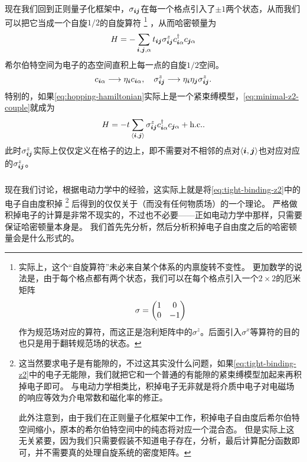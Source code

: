 现在我们回到正则量子化框架中，$\sigma_{\vb*{i} \vb*{j}}$在每一个格点引入了$\pm 1$两个状态，从而我们可以把它当成一个自旋$1/2$的自旋算符%
\footnote{实际上，这个“自旋算符”未必来自某个体系的内禀旋转不变性。
更加数学的说法是，由于每个格点都有两个状态，我们可以在每个格点引入一个$2\times 2$的厄米矩阵
\[
    {\sigma} = \pmqty{1 & 0 \\ 0 & -1}
\]
作为规范场对应的算符，而这正是泡利矩阵中的${\sigma}^z$。后面引入${\sigma}^x$等算符的目的也只是用于翻转规范场的状态。
}%
，从而哈密顿量为
\begin{equation}
    {H} = - \sum_{\vb*{i}, \vb*{j}, \alpha} t_{\vb*{i} \vb*{j}} {\sigma}^z_{\vb*{i} \vb*{j}} {c}_{\vb*{i} \alpha}^\dagger {c}_{\vb*{j} \alpha}
    \label{eq:minimal-z2-couple}
\end{equation}
希尔伯特空间为电子的态空间直积上每一点的自旋$1/2$空间。
\begin{equation}
    {c}_{\vb*{i} \alpha} \longrightarrow \eta_{\vb*{i}} {c}_{\vb*{i} \alpha}, \quad {\sigma}_{\vb*{i} \vb*{j}}^z \longrightarrow \eta_{\vb*{i}} \eta_{\vb*{j}} {\sigma}_{\vb*{i} \vb*{j}}^z.
\end{equation}
特别的，如果\eqref{eq:hopping-hamiltonian}实际上是一个紧束缚模型，\eqref{eq:minimal-z2-couple}就成为
\begin{equation}
    {H} = - t \sum_{\langle \vb*{i}, \vb*{j} \rangle} {\sigma}^z_{\vb*{i} \vb*{j}} {c}_{\vb*{i} \alpha}^\dagger {c}_{\vb*{j} \alpha} + \text{h.c.}.
    \label{eq:tight-binding-z2}
\end{equation}
此时$\sigma_{\vb*{i} \vb*{j}}^z$实际上仅仅定义在格子的边上，即不需要对不相邻的点对$\langle \vb*{i}, \vb*{j} \rangle$也对应对应的$\sigma_{\vb*{i} \vb*{j}}^z$。

\subsubsection{}

现在我们讨论，根据电动力学中的经验，这实际上就是将\eqref{eq:tight-binding-z2}中的电子自由度积掉%
\footnote{
    这当然要求电子是有能隙的，不过这其实没什么问题，如果\eqref{eq:tight-binding-z2}中的电子无能隙，我们就把它和一个普通的有能隙的紧束缚模型加起来再积掉电子即可。
    与电动力学相类比，积掉电子无非就是将介质中电子对电磁场的响应等效为介电常数和磁化率的修正。

    此外注意到，由于我们在正则量子化框架中工作，积掉电子自由度后希尔伯特空间缩小，原本的希尔伯特空间中的纯态将对应一个混合态。
    但是实际上这无关紧要，因为我们只需要假装不知道电子存在，分析，最后计算配分函数即可，并不需要真的处理自旋系统的密度矩阵。}%
后得到的仅仅关于（而没有任何物质场）的一个理论。
严格做积掉电子的计算是非常不现实的，不过也不必要——正如电动力学中那样，只需要保证哈密顿量本身是。
我们首先先分析，然后分析积掉电子自由度之后的哈密顿量会是什么形式的。

